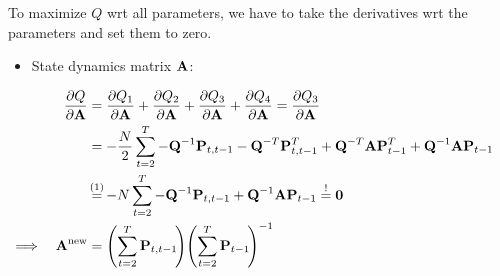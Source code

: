 	To maximize \(Q\) \ac{wrt} all parameters, we have to take the derivatives \ac{wrt} the parameters and set them to zero.
	\begin{itemize}
		\item State dynamics matrix \(\boldsymbol{\mathrm{A}}\):
	\end{itemize}
	\begin{align}
		&&\pdv{Q}{\mat{A}}
			&= \pdv{Q_1}{\mat{A}} + \pdv{Q_2}{\mat{A}} + \pdv{Q_3}{\mat{A}} + \pdv{Q_4}{\mat{A}} = \pdv{Q_3}{\mat{A}} & \nonumber \\
		&&	&= -\frac{N}{2} \sum_{t = 2}^{T} -\mat{Q}^{-1} \mat{P}_{t, t - 1} - \mat{Q}^{-T} \mat{P}_{t, t - 1}^T + \mat{Q}^{-T} \mat{A} \mat{P}_{t - 1}^T + \mat{Q}^{-1} \mat{A} \mat{P}_{t - 1} & \nonumber \\
		&&	&\oversetfootnotemark{=} -N \sum_{t = 2}^{T} -\mat{Q}^{-1} \mat{P}_{t, t - 1} + \mat{Q}^{-1} \mat{A} \mat{P}_{t - 1} \overset{!}{=} \mat{0} & \nonumber \\
		\implies && \mat{A}^\new &= \Bigg(\! \sum_{t = 2}^{T} \mat{P}_{t, t - 1} \!\Bigg) \Bigg(\! \sum_{t = 2}^{T} \mat{P}_{t - 1} \!\Bigg)^{-1} & \label{eqn:stateDynamicsMatrix}
	\end{align}
	
